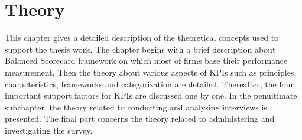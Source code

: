 \chapter{Theory}

This chapter gives a detailed description of the theoretical concepts used to support the thesis work. The chapter begins with a brief description about Balanced Scorecard framework on which most of firms base their performance measurement. Then the theory about various aspects of KPIs such as principles, characteristics, frameworks and categorization are detailed.  Thereafter, the four important support factors for KPIs are discussed one by one. In the penultimate subchapter,  the theory related to conducting and analysing interviews is presented. The final part concerns the theory related to administering and investigating the survey.





